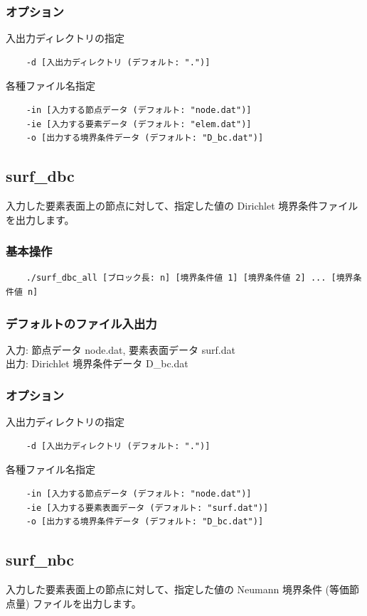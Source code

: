 \documentclass[8pt,a4paper]{article}
\begin{document}
\subsubsection*{オプション}
入出力ディレクトリの指定
\begin{verbatim}
    -d [入出力ディレクトリ (デフォルト: ".")]
\end{verbatim}
各種ファイル名指定
\begin{verbatim}
    -in [入力する節点データ (デフォルト: "node.dat")]
    -ie [入力する要素データ (デフォルト: "elem.dat")]
    -o [出力する境界条件データ (デフォルト: "D_bc.dat")]
\end{verbatim}

\subsection{surf\_dbc}
入力した要素表面上の節点に対して、指定した値の Dirichlet 境界条件ファイルを出力します。
\subsubsection*{基本操作}
\begin{verbatim}
	./surf_dbc_all [ブロック長: n] [境界条件値 1] [境界条件値 2] ... [境界条件値 n]
\end{verbatim}

\subsubsection*{デフォルトのファイル入出力}
入力: 節点データ node.dat, 要素表面データ surf.dat \\ \noindent
出力: Dirichlet 境界条件データ D\_bc.dat

\subsubsection*{オプション}
入出力ディレクトリの指定
\begin{verbatim}
    -d [入出力ディレクトリ (デフォルト: ".")]
\end{verbatim}
各種ファイル名指定
\begin{verbatim}
    -in [入力する節点データ (デフォルト: "node.dat")]
    -ie [入力する要素表面データ (デフォルト: "surf.dat")]
    -o [出力する境界条件データ (デフォルト: "D_bc.dat")]
\end{verbatim}


\subsection{surf\_nbc}
入力した要素表面上の節点に対して、指定した値の Neumann 境界条件 (等価節点量) ファイルを出力します。
\end{document}
